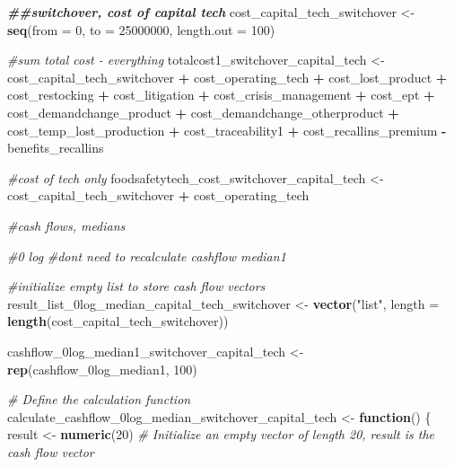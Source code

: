 \documentclass[
]{article}
\newenvironment{Shaded}{\begin{snugshade}}{\end{snugshade}}
\newcommand{\AttributeTok}[1]{\textcolor[rgb]{0.13,0.29,0.53}{#1}}
\newcommand{\CommentTok}[1]{\textcolor[rgb]{0.56,0.35,0.01}{\textit{#1}}}
\newcommand{\ControlFlowTok}[1]{\textcolor[rgb]{0.13,0.29,0.53}{\textbf{#1}}}
\newcommand{\DecValTok}[1]{\textcolor[rgb]{0.00,0.00,0.81}{#1}}
\newcommand{\DocumentationTok}[1]{\textcolor[rgb]{0.56,0.35,0.01}{\textbf{\textit{#1}}}}
\newcommand{\FunctionTok}[1]{\textcolor[rgb]{0.13,0.29,0.53}{\textbf{#1}}}
\newcommand{\NormalTok}[1]{#1}
\newcommand{\OtherTok}[1]{\textcolor[rgb]{0.56,0.35,0.01}{#1}}
\newcommand{\SpecialCharTok}[1]{\textcolor[rgb]{0.81,0.36,0.00}{\textbf{#1}}}
\newcommand{\StringTok}[1]{\textcolor[rgb]{0.31,0.60,0.02}{#1}}
\begin{document}
\begin{Shaded}
\begin{Highlighting}[]
\DocumentationTok{\#\#switchover, cost of capital tech}
\NormalTok{cost\_capital\_tech\_switchover }\OtherTok{\textless{}{-}} \FunctionTok{seq}\NormalTok{(}\AttributeTok{from =} \DecValTok{0}\NormalTok{, }\AttributeTok{to =} \DecValTok{25000000}\NormalTok{, }\AttributeTok{length.out =} \DecValTok{100}\NormalTok{)}

\CommentTok{\#sum total cost {-} everything}
\NormalTok{totalcost1\_switchover\_capital\_tech }\OtherTok{\textless{}{-}}\NormalTok{ cost\_capital\_tech\_switchover }\SpecialCharTok{+}\NormalTok{ cost\_operating\_tech }\SpecialCharTok{+}\NormalTok{ cost\_lost\_product }\SpecialCharTok{+}\NormalTok{ cost\_restocking }\SpecialCharTok{+}\NormalTok{ cost\_litigation }\SpecialCharTok{+}\NormalTok{ cost\_crisis\_management }\SpecialCharTok{+}\NormalTok{ cost\_ept }\SpecialCharTok{+}\NormalTok{ cost\_demandchange\_product }\SpecialCharTok{+}\NormalTok{ cost\_demandchange\_otherproduct }\SpecialCharTok{+}\NormalTok{ cost\_temp\_lost\_production }\SpecialCharTok{+}\NormalTok{ cost\_traceability1 }\SpecialCharTok{+}\NormalTok{ cost\_recallins\_premium }\SpecialCharTok{{-}}\NormalTok{ benefits\_recallins}


\CommentTok{\#cost of tech only}
\NormalTok{foodsafetytech\_cost\_switchover\_capital\_tech }\OtherTok{\textless{}{-}}\NormalTok{ cost\_capital\_tech\_switchover }\SpecialCharTok{+}\NormalTok{ cost\_operating\_tech}



\CommentTok{\#cash flows, medians}

\CommentTok{\#0 log}
\CommentTok{\#don\textquotesingle{}t need to recalculate cashflow median1}


\CommentTok{\#initialize empty list to store cash flow vectors}
\NormalTok{result\_list\_0log\_median\_capital\_tech\_switchover }\OtherTok{\textless{}{-}} \FunctionTok{vector}\NormalTok{(}\StringTok{"list"}\NormalTok{, }\AttributeTok{length =} \FunctionTok{length}\NormalTok{(cost\_capital\_tech\_switchover))}

\NormalTok{cashflow\_0log\_median1\_switchover\_capital\_tech }\OtherTok{\textless{}{-}} \FunctionTok{rep}\NormalTok{(cashflow\_0log\_median1, }\DecValTok{100}\NormalTok{)}

\CommentTok{\# Define the calculation function}
\NormalTok{calculate\_cashflow\_0log\_median\_switchover\_capital\_tech }\OtherTok{\textless{}{-}} \ControlFlowTok{function}\NormalTok{() \{}
\NormalTok{  result }\OtherTok{\textless{}{-}} \FunctionTok{numeric}\NormalTok{(}\DecValTok{20}\NormalTok{)  }\CommentTok{\# Initialize an empty vector of length 20, result is the cash flow vector}
  

\end{Highlighting}
\end{Shaded}
\end{document}
